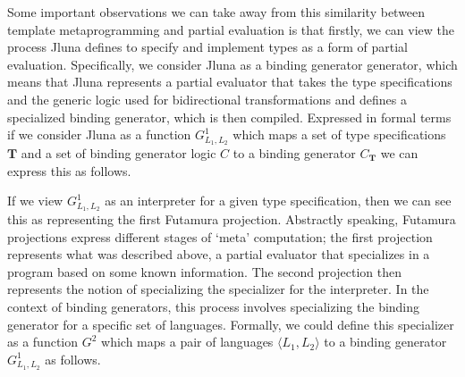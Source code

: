 \begin{definition}

Some important observations we can take away from this similarity between template metaprogramming and partial evaluation is that firstly, we can view the process Jluna defines to specify and implement types as a form of partial evaluation. Specifically, we consider Jluna as a binding generator generator, which means that Jluna represents a partial evaluator that takes the type specifications and the generic logic used for bidirectional transformations and defines a specialized binding generator, which is then compiled. Expressed in formal terms if we consider Jluna as a function $G^1_{L_1,L_2}$ which maps a set of type specifications $\mathbf T$ and a set of binding generator logic $C$ to a binding generator $C_{\mathbf T}$ we can express this as follows.



\end{definition}

\begin{definition}

If we view $G^1_{L_1,L_2}$ as an interpreter for a given type specification, then we can see this as representing the first Futamura projection. Abstractly speaking, Futamura projections express different stages of `meta' computation; the first projection represents what was described above, a partial evaluator that specializes in a program based on some known information. The second projection then represents the notion of specializing the specializer for the interpreter. In the context of binding generators, this process involves specializing the binding generator for a specific set of languages. Formally, we could define this specializer as a function $G^2$ which maps a pair of languages $\langle L_1, L_2 \rangle$ to a binding generator $G^1_{L_1,L_2}$ as follows.



\end{definition}

